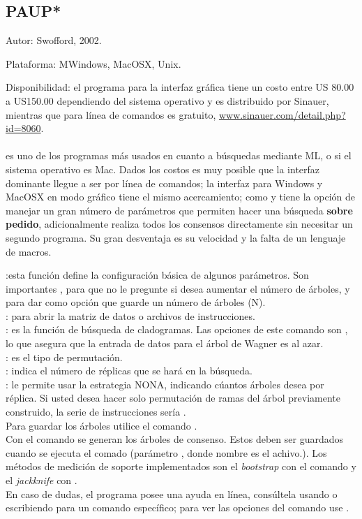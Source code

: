 \subsection{PAUP*}
\noindent
Autor: Swofford, 2002.

Plataforma: MWindows, MacOSX, Unix.

Disponibilidad: el programa para la interfaz gr\'afica tiene un costo entre US 80.00 a US150.00 dependiendo del sistema operativo y es distribuido por Sinauer, mientras que para l\'inea de comandos es gratuito, \url{www.sinauer.com/detail.php?id=8060}.


\paragraph*{}
 es uno de los programas m\'as usados en cuanto a b\'usquedas mediante ML, o si el sistema operativo es Mac. Dados los costos es muy posible que la interfaz dominante llegue a ser por l\'inea de comandos; la interfaz para Windows y MacOSX en modo gr\'afico tiene el mismo acercamiento; como  y  tiene la opci\'on de manejar un gran n\'umero de par\'ametros que permiten hacer una b\'usqueda \textbf{sobre pedido}, adicionalmente realiza todos los consensos directamente sin necesitar un segundo programa. Su gran desventaja es su velocidad y la falta de un lenguaje de macros.


:esta funci\'on define la configuraci\'on b\'asica de algunos par\'ametros. Son importantes , para que no le pregunte si desea aumentar el n\'umero de \'arboles, y  para dar como opci\'on que guarde un n\'umero de \'arboles (N).\\
: para abrir la matriz de datos o archivos de instrucciones.\\
: es la funci\'on de b\'usqueda de cladogramas. Las opciones de este comando son , lo que asegura que la entrada de datos para el \'arbol de Wagner es al azar.\\
: es el tipo de permutaci\'on.\\
: indica el n\'umero de r\'eplicas que se har\'a en la b\'usqueda.\\ 
: le permite usar la estrategia NONA, indicando c\'uantos \'arboles desea por r\'eplica. Si usted desea hacer solo permutaci\'on de ramas del \'arbol previamente construido, la serie de instrucciones ser\'ia .\\
Para guardar los \'arboles utilice el comando .\\
Con el comando  se generan los \'arboles de consenso. Estos deben ser guardados cuando se ejecuta el comado (par\'ametro , donde nombre es el achivo.). Los m\'etodos de medici\'on de soporte implementados son el \textit{bootstrap} con el comando  y el \textit{jackknife} con .\\
En caso de dudas, el programa posee una ayuda en l\'inea, cons\'ultela usando  o escribiendo  para un comando espec\'ifico; para ver las opciones del comando use .